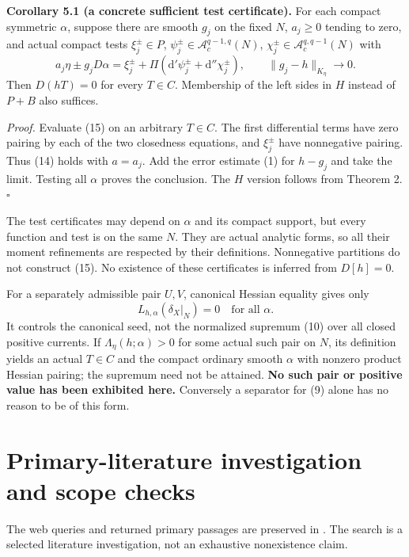 \documentclass[
  11pt,
]{article}
\begin{document}
\textbf{Corollary 5.1 (a concrete sufficient test certificate).} For
each compact symmetric \(\alpha\), suppose there are smooth \(g_j\) on
the fixed \(N\), \(a_j\geq0\) tending to zero, and actual compact tests
\(\xi_j^\pm\in P\), \(\psi_j^\pm\in\mathcal A_c^{q-1,q}(N)\),
\(\chi_j^\pm\in\mathcal A_c^{q,q-1}(N)\) with \[
 a_j\eta\pm g_jD\alpha=
      \xi_j^\pm+\Pi(\mathrm d'\psi_j^\pm+\mathrm d''\chi_j^\pm),
\qquad \|g_j-h\|_{K_\eta}\to0.                              \tag{15}
\] Then \(D(hT)=0\) for every \(T\in C\). Membership of the left sides
in \(H\) instead of \(P+B\) also suffices.

\emph{Proof.} Evaluate (15) on an arbitrary \(T\in C\). The first
differential terms have zero pairing by each of the two closedness
equations, and \(\xi_j^\pm\) have nonnegative pairing. Thus (14) holds
with \(a=a_j\). Add the error estimate (1) for \(h-g_j\) and take the
limit. Testing all \(\alpha\) proves the conclusion. The \(H\) version
follows from Theorem 2. \(\square\)

The test certificates may depend on \(\alpha\) and its compact support,
but every function and test is on the same \(N\). They are actual
analytic forms, so all their moment refinements are respected by their
definitions. Nonnegative partitions do not construct (15). No existence
of these certificates is inferred from \(D[h]=0\).

For a separately admissible pair \(U,V\), canonical Hessian equality
gives only \[L_{h,\alpha}(\delta_X|_N)=0\quad\text{for all }\alpha.\] It
controls the canonical seed, not the normalized supremum (10) over all
closed positive currents. If \(\Lambda_\eta(h;\alpha)>0\) for some
actual such pair on \(N\), its definition yields an actual \(T\in C\)
and the compact ordinary smooth \(\alpha\) with nonzero product Hessian
pairing; the supremum need not be attained. \textbf{No such pair or
positive value has been exhibited here.} Conversely a separator for (9)
alone has no reason to be of this form.

\section{Primary-literature investigation and scope
checks}\label{primary-literature-investigation-and-scope-checks}

The web queries and returned primary passages are preserved in
. The search is a selected literature
investigation, not an exhaustive nonexistence claim.
\end{document}
